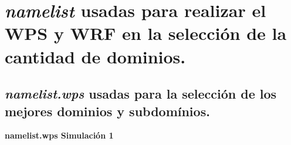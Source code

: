 
\chapter{\textit{namelist} usadas para realizar el WPS y WRF en la selección de la cantidad de dominios.}
\label{anexo:namelist-input-wps}

\section{\textit{namelist.wps} usadas para la selección de los mejores dominios y subdomínios.}




\textbf{namelist.wps  Simulación 1}


